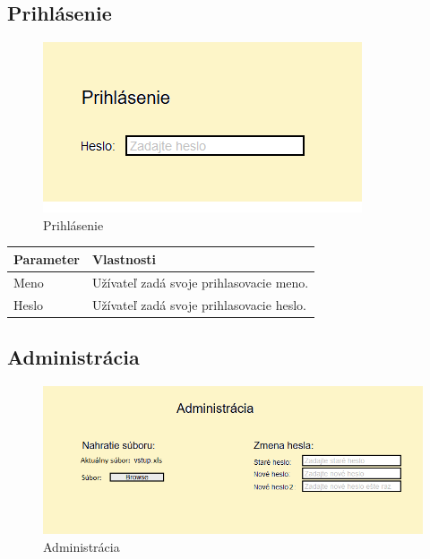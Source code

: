 \documentclass[12pt,a4paper]{report}
\begin{document}
\subsection[Prihlásenie]{\rmfamily\bfseries
	Prihlásenie}

\begin{figure}[htb]
	\centering
	\includegraphics[scale=0.6]{prihlasenie}
	\caption{Prihlásenie}
	\label{fig:Prihlásenie}
\end{figure}


\begin{table}[h!]
	\centering
	\begin{tabular}{|>{\centering\arraybackslash}m{3in}|>{\centering\arraybackslash}m{3in}|}
		\hline
		\centering Parameter & Vlastnosti \\ [0ex]
		\hline
		Meno & Užívateľ zadá svoje prihlasovacie meno.\\ [0ex]
		\hline
		Heslo & Užívateľ zadá svoje prihlasovacie heslo. \\ [0ex]
		\hline
	\end{tabular}
\end{table}
\FloatBarrier
\subsection[Administrácia]{\rmfamily\bfseries
	Administrácia}

\begin{figure}[!h]
	\centering
	\includegraphics[scale=0.7]{admin}
	\caption{Administrácia}
	\label{fig:Administrácia}
\end{figure}
\end{document}
